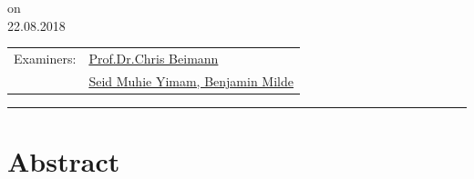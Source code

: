 \documentclass[12pt,final,twoside]{report}
\makeatletter
\newcommand{\trauthor}{Ethem Can Karaoguz}
\newcommand{\trmatrikelnummer}{6641214}
\newcommand{\trgutachterA}{\href{mailto:beimann@informatik.uni-hamburg.de}{Prof.Dr.Chris Beimann}}
\newcommand{\trgutachterB}{\href{mailto:yimam@informatik.uni-hamburg.de, milde@informatik.uni-hamburg.de}{Seid Muhie Yimam, Benjamin Milde}}
\newcommand{\trdate}{22.08.2018}
\theoremstyle{plain}
\theoremstyle{definition}
\theoremstyle{remark}
\makeatother
\begin{document}
\begin{titlepage}
\begin{center}
      on\\
      \trdate
    \end{center}
    \vspace{2cm}
    \begin{center}
    \begin{tabular}{ll}
    Examiners: & \trgutachterA \\
                   & \trgutachterB \\
    \end{tabular}
    \end{center}
    \vfill
    \rule{\textwidth}{0.4pt}
    \newpage 
\end{titlepage}

\thispagestyle{empty}
\hspace{1cm}
\newpage

\section*{Abstract}\label{sec:abstract}
\end{document}
